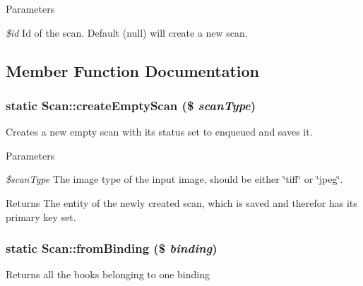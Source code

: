 \begin{DoxyParams}{Parameters}
\item[{\em \$id}]Id of the scan. Default (null) will create a new scan. \end{DoxyParams}


\subsection{Member Function Documentation}
\hypertarget{classScan_a72b5430d02418d3172fce94f5dac3535}{
\subsubsection[{createEmptyScan}]{\setlength{\rightskip}{0pt plus 5cm}static Scan::createEmptyScan (\$ {\em scanType})}}
\label{classScan_a72b5430d02418d3172fce94f5dac3535}
Creates a new empty scan with its status set to enqueued and saves it.


\begin{DoxyParams}{Parameters}
\item[{\em \$scanType}]The image type of the input image, should be either \char`\"{}tiff\char`\"{} or \char`\"{}jpeg\char`\"{}.\end{DoxyParams}
\begin{DoxyReturn}{Returns}
The entity of the newly created scan, which is saved and therefor has its primary key set. 
\end{DoxyReturn}
\hypertarget{classScan_abc15811492a84be59c482e562a73cd22}{
\subsubsection[{fromBinding}]{\setlength{\rightskip}{0pt plus 5cm}static Scan::fromBinding (\$ {\em binding})}}
\label{classScan_abc15811492a84be59c482e562a73cd22}
Returns all the books belonging to one binding


